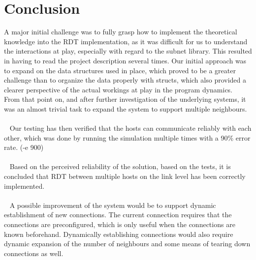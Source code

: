\section{Conclusion}
A major initial challenge was to fully grasp how to implement the theoretical knowledge into the RDT implementation, as it was difficult for us to understand the interactions at play, especially with regard to the subnet library. This resulted in having to read the project description several times.
Our initial approach was to expand on the data structures used in place, which proved to be a greater challenge than to organize the data properly with structs, which also provided a clearer perspective of the actual workings at play in the program dynamics.\\
From that point on, and after further investigation of the underlying systems, it was an almost trivial task to expand the system to support multiple neighbours.\\
\\~
Our testing has then verified that the hosts can communicate reliably with each other, which was done by running the simulation multiple times with a 90\% error rate. (-e 900)\\
\\~
Based on the perceived reliability of the solution, based on the tests, it is concluded that RDT between multiple hosts on the link level has been correctly implemented.\\
\\~
A possible improvement of the system would be to support dynamic establishment of new connections. The current connection requires that the connections are preconfigured, which is only useful when the connections are known beforehand. Dynamically establishing connections would also require dynamic expansion of the number of neighbours and some means of tearing down connections as well.
